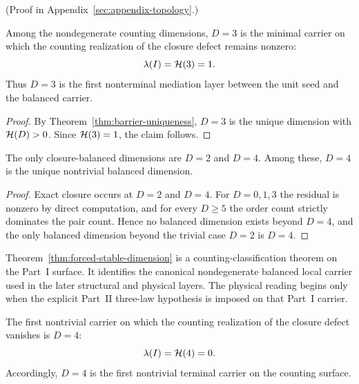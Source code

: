 (Proof in Appendix~\ref{sec:appendix-topology}.)

\begin{corollary}
\label{cor:minimal-nonterminal-counting-carrier}
Among the nondegenerate counting dimensions, \(D=3\) is the minimal carrier on
which the counting realization of the closure defect remains nonzero:
\[
\lambda(I)=\mathcal{H}(3)=1.
\]
Thus \(D=3\) is the first nonterminal mediation layer between the unit seed and
the balanced carrier.
\end{corollary}

\begin{proof}
By Theorem~\ref{thm:barrier-uniqueness}, \(D=3\) is the unique dimension with
\(\mathcal{H}(D)>0\). Since \(\mathcal{H}(3)=1\), the claim follows.
\end{proof}

\begin{theorem}\label{thm:forced-stable-dimension}
The only closure-balanced dimensions are $D = 2$ and $D = 4$.
Among these, $D = 4$ is the unique nontrivial balanced dimension.
\end{theorem}

\begin{proof}
Exact closure occurs at $D = 2$ and $D = 4$.
For $D = 0,1,3$ the residual is nonzero by direct computation, and for every $D \geq 5$ the order count strictly dominates the pair count.
Hence no balanced dimension exists beyond $D = 4$, and the only balanced dimension beyond the trivial case $D = 2$ is $D = 4$.
\end{proof}

\begin{remark}[Role of the \(D=4\) theorem]
Theorem~\ref{thm:forced-stable-dimension} is a counting-classification theorem
on the Part~I surface. It identifies the canonical nondegenerate balanced
local carrier used in the later structural and physical layers. The physical
reading begins only when the explicit Part~II three-law hypothesis is imposed
on that Part~I carrier.
\end{remark}

\begin{corollary}
\label{cor:first-nontrivial-terminal-counting-carrier}
The first nontrivial carrier on which the counting realization of the closure
defect vanishes is \(D=4\):
\[
\lambda(I)=\mathcal{H}(4)=0.
\]
Accordingly, \(D=4\) is the first nontrivial terminal carrier on the counting
surface.
\end{corollary}


